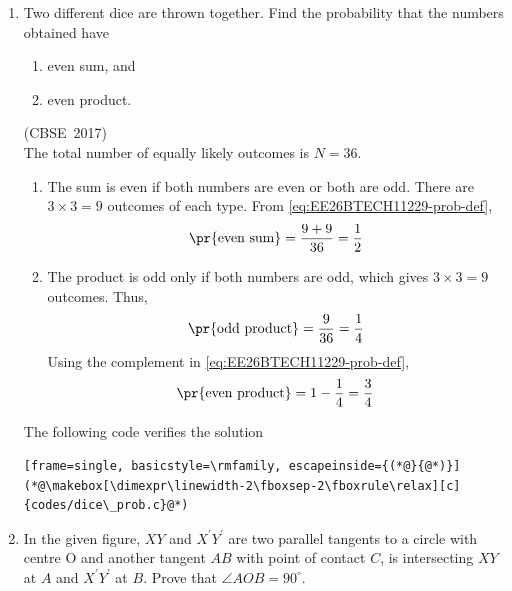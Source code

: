 \begin{enumerate}[label=\thesubsection.\arabic*, ref=\thesubsection.\theenumi]
\begin{align}
	\mydet{\myvec{2k-1 & 4k-2 \\ 3 & 3k}} &= 0
	\\
	\implies 3k\brak{2k-1} - 3\brak{4k-2} &= 0
	\\
	\implies 2k^2 - 5k + 2 &= 0
	\\
	\implies \brak{2k-1}\brak{k-2} &= 0
\end{align}
Hence,
\begin{align}
	k = \frac{1}{2} \quad \text{or} \quad k = 2
\end{align}
\item 
Two different dice are thrown together. Find the probability that the numbers obtained have
\begin{enumerate}
	\item even sum, and
	\item even product.
\end{enumerate}
\hfill (CBSE~2017)
\\
\solution
The total number of equally likely outcomes is $N = 36$.
\begin{enumerate}
\item The sum is even if both numbers are even or both are odd. There are $3 \times 3 = 9$ outcomes of each type. From \eqref{eq:EE26BTECH11229-prob-def},
\begin{align}
	\pr{\text{even sum}} = \frac{9 + 9}{36} = \frac{1}{2}
\end{align}
\item The product is odd only if both numbers are odd, which gives $3 \times 3 = 9$ outcomes. Thus,
\begin{align}
	\pr{\text{odd product}} = \frac{9}{36} = \frac{1}{4}
\end{align}
Using the complement in \eqref{eq:EE26BTECH11229-prob-def},
\begin{align}
	\pr{\text{even product}} = 1 - \frac{1}{4} = \frac{3}{4}
\end{align}
\end{enumerate}
The following code verifies the solution
\begin{lstlisting}[frame=single, basicstyle=\rmfamily, escapeinside={(*@}{@*)}]
(*@\makebox[\dimexpr\linewidth-2\fboxsep-2\fboxrule\relax][c]{codes/dice\_prob.c}@*)
\end{lstlisting}
\item 
In the given figure, $XY$ and $X^{\prime}Y^{\prime}$ are two parallel tangents to a circle with centre O and another tangent $AB$ with point of contact $C$, is intersecting $XY$ at $A$ and $X^{\prime}Y^{\prime}$ at $B$. Prove that $\angle AOB = 90^{\circ}$.

\end{enumerate}
